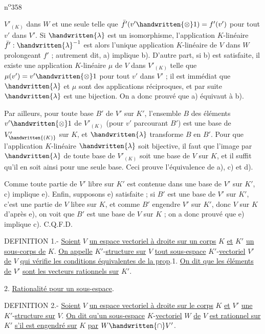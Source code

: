 \noindent\hfill n\textsuperscript{o}358

$V'_{(K)}$ dans $W$ et une seule telle que $\bar f'(v'\handwritten{\otimes} 1)=f'(v')$ pour tout $v'$ dans $V'$. Si $\handwritten{\lambda}$ est un isomorphisme, l'application $K$-linéaire $\bar f':\handwritten{\lambda}^{-1}$ est alors l'unique application $K$-linéaire de $V$ dans $W$ prolongeant $f'$ ; autrement dit, a) implique b). D'autre part, si b) est satisfaite, il existe une application $K$-linéaire $\mu$ de $V$ dans $V'_{(K)}$ telle que $\mu(v')=v'\handwritten{\otimes} 1$ pour tout $v'$ dans $V'$ ; il est immédiat que $\handwritten{\lambda}$ et $\mu$ sont des applications réciproques, et par suite $\handwritten{\lambda}$ est une bijection. On a donc prouvé que a) équivaut à b).

Par ailleurs, pour toute base $B'$ de $V'$ sur $K'$, l'ensemble $B$ des éléments $v'\handwritten{\otimes} 1$ de $V'_{(K)}$ (pour $v'$ parcourant $B'$) est une base de $V'_{\handwritten{(K)}}$ sur $K$, et $\handwritten{\lambda}$ transforme $B$ en $B'$. Pour que l'application $K$-linéaire $\handwritten{\lambda}$ soit bijective, il faut que l'image par $\handwritten{\lambda}$ de toute base de $V'_{(K)}$ soit une base de $V$ sur $K$, et il suffit qu'il en soit ainsi pour une seule base. Ceci prouve l'équivalence de a), c) et d).

Comme toute partie de $V'$ libre sur $K'$ est contenue dans une base de $V'$ sur $K'$, c) implique e). Enfin, supposons e) satisfaite ; si $B'$ est une base de $V'$ sur $K'$, c'est une partie de $V$ libre sur $K$, et comme $B'$ engendre $V'$ sur $K'$, donc $V$ sur $K$ d'après e), on voit que $B'$ est une base de $V$ sur $K$ ; on a donc prouvé que e) implique c). C.Q.F.D.

DEFINITION 1.- \uline{Soient} $V$ \uline{un espace vectoriel à droite sur un corps} $K$ \uline{et} $K'$ \uline{un sous-corps de} $K$. \uline{On appelle} $K'$-\uline{structure sur} $V$ \uline{tout sous-espace} $K'$-\uline{vectoriel} $V'$ \uline{de} $V$ \uline{qui vérifie les conditions équivalentes de la prop}.1. \uline{On dit que les éléments de} $V'$ \uline{sont les vecteurs rationnels sur} $K'$.

2. \uline{Rationalité pour un sous-espace}.

DEFINITION 2.- \uline{Soient} $V$ \uline{un espace vectoriel à droite sur le corps} $K$ \uline{et} $V'$ \uline{une} $K'$-\uline{structure sur} $V$. \uline{On dit qu'un sous-espace} $K$-\uline{vectoriel} $W$ \uline{de} $V$ \uline{est rationnel sur} $K'$ \uline{s'il est engendré sur} $K$ \uline{par} $W\handwritten{\cap} V'$.


